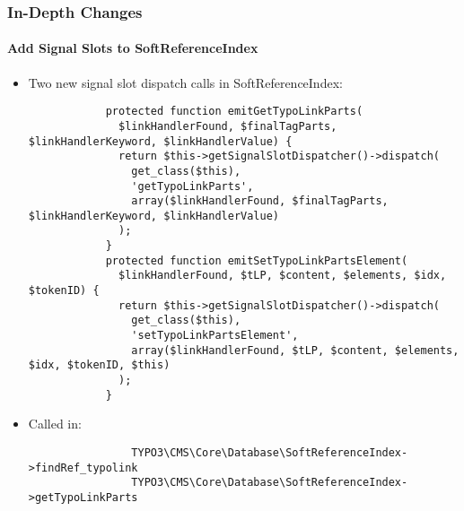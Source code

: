 \begin{frame}[fragile]
	\frametitle{In-Depth Changes}
	\framesubtitle{Add Signal Slots to SoftReferenceIndex}

	\lstset{
		basicstyle=\tiny\ttfamily
	}

	\begin{itemize}
		\item
			\smaller
				Two new signal slot dispatch calls in SoftReferenceIndex:
			\normalsize

		\begin{lstlisting}
			protected function emitGetTypoLinkParts(
			  $linkHandlerFound, $finalTagParts, $linkHandlerKeyword, $linkHandlerValue) {
			  return $this->getSignalSlotDispatcher()->dispatch(
			    get_class($this),
			    'getTypoLinkParts',
			    array($linkHandlerFound, $finalTagParts, $linkHandlerKeyword, $linkHandlerValue)
			  );
			}
			protected function emitSetTypoLinkPartsElement(
			  $linkHandlerFound, $tLP, $content, $elements, $idx, $tokenID) {
			  return $this->getSignalSlotDispatcher()->dispatch(
			    get_class($this),
			    'setTypoLinkPartsElement',
			    array($linkHandlerFound, $tLP, $content, $elements, $idx, $tokenID, $this)
			  );
			}
		\end{lstlisting}

		\item
			\smaller
				Called in:
			\normalsize

			\begin{lstlisting}
				TYPO3\CMS\Core\Database\SoftReferenceIndex->findRef_typolink
				TYPO3\CMS\Core\Database\SoftReferenceIndex->getTypoLinkParts
			\end{lstlisting}

	\end{itemize}

\end{frame}


